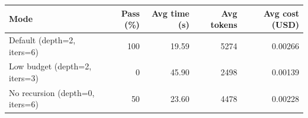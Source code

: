 \begin{tabular}{lrrrr}
\toprule
Mode & Pass (\%) & Avg time (s) & Avg tokens & Avg cost (USD) \\
\midrule
Default (depth=2, iters=6) & 100 & 19.59 & 5274 & 0.00266 \\
Low budget (depth=2, iters=3) & 0 & 45.90 & 2498 & 0.00139 \\
No recursion (depth=0, iters=6) & 50 & 23.60 & 4478 & 0.00228 \\
\bottomrule
\end{tabular}
